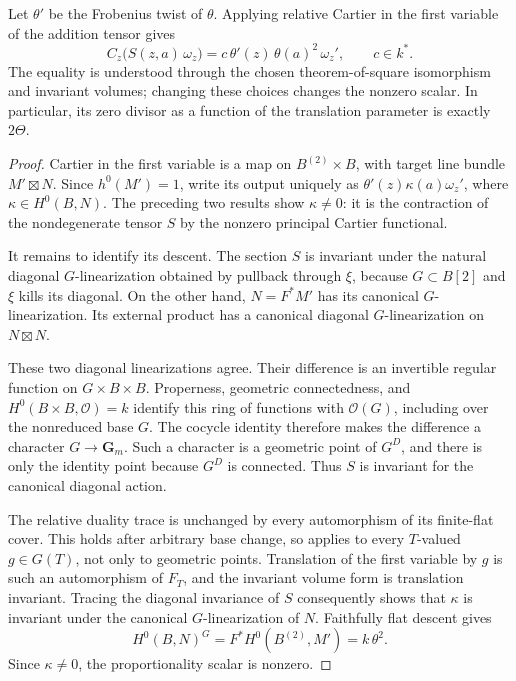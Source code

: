 \begin{proposition}
\label{prop:principal-theta-Cartier-square}
Let \(\theta'\) be the Frobenius twist of \(\theta\).  Applying
relative Cartier in the first variable of the addition tensor gives
\[
 C_z\bigl(S(z,a)\,\omega_z\bigr)
   =c\,\theta'(z)\,\theta(a)^2\,\omega_z',
 \qquad c\in k^*.
\]
The equality is understood through the chosen theorem-of-square
isomorphism and invariant volumes; changing these choices changes the
nonzero scalar.  In particular, its zero divisor as a function of the
translation parameter is exactly \(2\Theta\).
\end{proposition}
\begin{proof}
Cartier in the first variable is a map on \(B^{(2)}\times B\), with
target line bundle \(M'\boxtimes N\).  Since \(h^0(M')=1\), write
its output uniquely as \(\theta'(z)\kappa(a)\omega_z'\), where
\(\kappa\in H^0(B,N)\).  The preceding two results show
\(\kappa\ne0\): it is the contraction of the nondegenerate tensor
\(S\) by the nonzero principal Cartier functional.

It remains to identify its descent.  The section \(S\) is invariant
under the natural diagonal \(G\)-linearization obtained by pullback
through \(\xi\), because \(G\subset B[2]\) and \(\xi\) kills its
diagonal.  On the other hand, \(N=F^*M'\) has its canonical
\(G\)-linearization.  Its external product has a canonical diagonal
\(G\)-linearization on \(N\boxtimes N\).

These two diagonal linearizations agree.  Their difference is an
invertible regular function on \(G\times B\times B\).  Properness,
geometric connectedness, and \(H^0(B\times B,\mathcal O)=k\)
identify this ring of functions with \(\mathcal O(G)\), including
over the nonreduced base \(G\).  The cocycle identity therefore makes
the difference a character \(G\to\mathbf G_m\).  Such a character
is a geometric point of \(G^D\), and there is only the identity point
because \(G^D\) is connected.  Thus \(S\) is invariant for the
canonical diagonal action.

The relative duality trace is unchanged by every automorphism of its
finite-flat cover.  This holds after arbitrary base change, so applies
to every \(T\)-valued \(g\in G(T)\), not only to geometric points.
Translation of the first variable by \(g\) is such an automorphism
of \(F_T\), and the invariant volume form is translation invariant.
Tracing the diagonal invariance of \(S\) consequently shows that
\(\kappa\) is invariant under the canonical \(G\)-linearization
of \(N\).  Faithfully flat descent gives
\[
 H^0(B,N)^G=F^*H^0(B^{(2)},M')=k\,\theta^2.
\]
Since \(\kappa\ne0\), the proportionality scalar is nonzero.
\end{proof}

